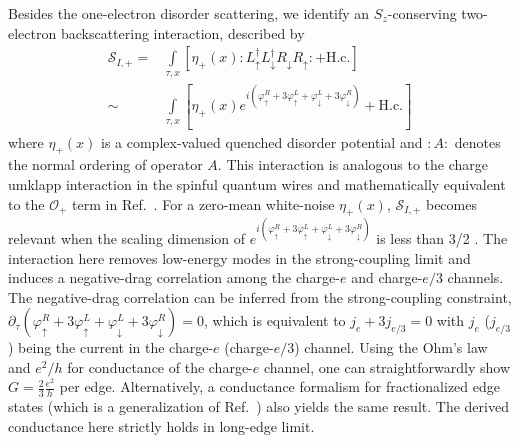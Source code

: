 \documentclass[aps,prx,amsmath,superscriptaddress,twocolumn,bibnotes,longbibliography,floatfix]{revtex4-2}
\begin{document}
	Besides the one-electron disorder scattering, we identify an $S_z$-conserving two-electron backscattering interaction, described by
	\begin{subequations}\label{Eq:S_I_+}
		\begin{align}
			\mathcal{S}_{I,+}=&\int\limits_{\tau,x}\left[\eta_+(x):L^{\dagger}_{\uparrow}L^{\dagger}_{\downarrow}R_{\downarrow}R_{\uparrow}:+\text{H.c.}\right]\\
			\sim&\int\limits_{\tau,x}\left[\eta_+(x)e^{i\left(\varphi^R_{\uparrow}+3\varphi^L_{\uparrow}+\varphi^L_{\downarrow}+3\varphi^R_{\downarrow}\right)}+\text{H.c.}\right]
		\end{align}
	\end{subequations}
	where $\eta_+(x)$ is a complex-valued quenched disorder potential and $:A:$ denotes the normal ordering of operator $A$. This interaction is analogous to the charge umklapp interaction in the spinful quantum wires \cite{GogolinAO2004,GiamarchiT2003} and mathematically equivalent to the $\mathcal{O}_+$ term in Ref.~\cite{ChouYZ2024}. For a zero-mean white-noise $\eta_+(x)$, $\mathcal{S}_{I,+}$ becomes relevant when the scaling dimension of $e^{i\left(\varphi^R_{\uparrow}+3\varphi^L_{\uparrow}+\varphi^L_{\downarrow}+3\varphi^R_{\downarrow}\right)}$ is less than 3/2 \cite{GiamarchiT1988,GiamarchiT2003}. The interaction here removes low-energy modes in the strong-coupling limit and induces a negative-drag correlation among the charge-$e$ and charge-$e/3$ channels. The negative-drag correlation can be inferred from the strong-coupling constraint, $\partial_{\tau}(\varphi^R_{\uparrow}+3\varphi^L_{\uparrow}+\varphi^L_{\downarrow}+3\varphi^R_{\downarrow})=0$, which is equivalent to $j_e+3j_{e/3}=0$ with $j_e$ ($j_{e/3}$) being the current in the charge-$e$ (charge-$e/3$) channel. Using the Ohm's law and $e^2/h$ for conductance of the charge-$e$ channel, one can straightforwardly show $G=\frac{2}{3}\frac{e^2}{h}$ per edge. Alternatively, a conductance formalism for fractionalized edge states \cite{ChouYZ2024} (which is a generalization of Ref.~\cite{OregY2014}) also yields the same result. The derived conductance here strictly holds in long-edge limit.
\end{document}
